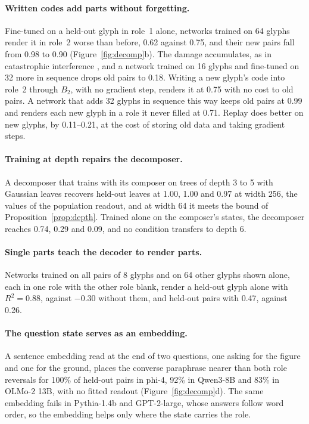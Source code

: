\paragraph{Written codes add parts without forgetting.} Fine-tuned on a held-out glyph in role~1 alone, networks trained on 64 glyphs render it in role~2 worse than before, 0.62 against 0.75, and their new pairs fall from 0.98 to 0.90 (Figure~\ref{fig:decomp}b). The damage accumulates, as in catastrophic interference \citep{mccloskey1989}, and a network trained on 16 glyphs and fine-tuned on 32 more in sequence drops old pairs to 0.18. Writing a new glyph's code into role~2 through $B_2$, with no gradient step, renders it at 0.75 with no cost to old pairs. A network that adds 32 glyphs in sequence this way keeps old pairs at 0.99 and renders each new glyph in a role it never filled at 0.71. Replay does better on new glyphs, by 0.11--0.21, at the cost of storing old data and taking gradient steps.

\paragraph{Training at depth repairs the decomposer.} A decomposer that trains with its composer on trees of depth 3 to 5 with Gaussian leaves recovers held-out leaves at 1.00, 1.00 and 0.97 at width 256, the values of the population readout, and at width 64 it meets the bound of Proposition~\ref{prop:depth}. Trained alone on the composer's states, the decomposer reaches 0.74, 0.29 and 0.09, and no condition transfers to depth 6.

\paragraph{Single parts teach the decoder to render parts.} Networks trained on all pairs of 8 glyphs and on 64 other glyphs shown alone, each in one role with the other role blank, render a held-out glyph alone with $R^2 = 0.88$, against $-0.30$ without them, and held-out pairs with 0.47, against 0.26.

\paragraph{The question state serves as an embedding.} A sentence embedding read at the end of two questions, one asking for the figure and one for the ground, places the converse paraphrase nearer than both role reversals for 100\% of held-out pairs in phi-4, 92\% in Qwen3-8B and 83\% in OLMo-2 13B, with no fitted readout (Figure~\ref{fig:decomp}d). The same embedding fails in Pythia-1.4b and GPT-2-large, whose answers follow word order, so the embedding helps only where the state carries the role.

